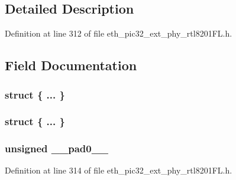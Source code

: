 \subsection{Detailed Description}


Definition at line 312 of file eth\+\_\+pic32\+\_\+ext\+\_\+phy\+\_\+rtl8201\+F\+L.\+h.



\subsection{Field Documentation}
\hypertarget{union___r_m_i_i_m_o_d_e_s_e_t_t_i_ngbits__t_a1bd1baf0b9fe39f7f085448d5ab7e390}{}\subsubsection[{"@140}]{\setlength{\rightskip}{0pt plus 5cm}struct \{ ... \} }\label{union___r_m_i_i_m_o_d_e_s_e_t_t_i_ngbits__t_a1bd1baf0b9fe39f7f085448d5ab7e390}
\hypertarget{union___r_m_i_i_m_o_d_e_s_e_t_t_i_ngbits__t_a4f4b484d4a73122089b26a85e5a1bf3a}{}\subsubsection[{"@142}]{\setlength{\rightskip}{0pt plus 5cm}struct \{ ... \} }\label{union___r_m_i_i_m_o_d_e_s_e_t_t_i_ngbits__t_a4f4b484d4a73122089b26a85e5a1bf3a}
\hypertarget{union___r_m_i_i_m_o_d_e_s_e_t_t_i_ngbits__t_adf71f3d8410c1f1dbbc96680a92c49af}{}
\subsubsection[{\+\_\+\+\_\+pad0\+\_\+\+\_\+}]{\setlength{\rightskip}{0pt plus 5cm}unsigned \+\_\+\+\_\+pad0\+\_\+\+\_\+}\label{union___r_m_i_i_m_o_d_e_s_e_t_t_i_ngbits__t_adf71f3d8410c1f1dbbc96680a92c49af}


Definition at line 314 of file eth\+\_\+pic32\+\_\+ext\+\_\+phy\+\_\+rtl8201\+F\+L.\+h.

\hypertarget{union___r_m_i_i_m_o_d_e_s_e_t_t_i_ngbits__t_acaf2d0924a107ec6e8d2e31febaf66f9}{}

